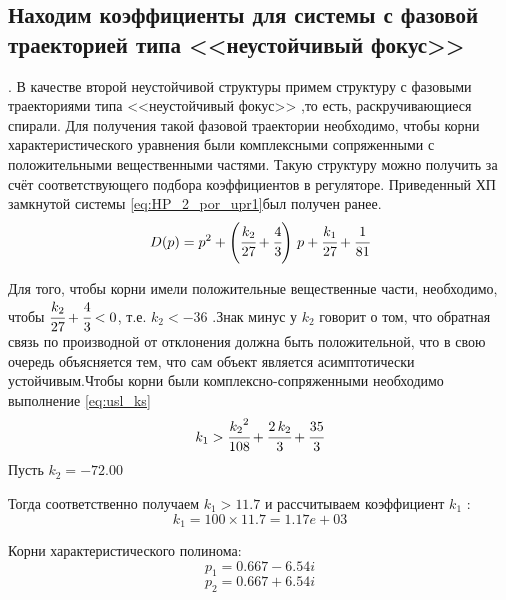 \clearpage
\subsection{Находим коэффициенты для системы с фазовой траекторией типа <<неустойчивый фокус>>}
. В качестве второй неустойчивой структуры примем структуру с фазовыми траекториями типа <<неустойчивый фокус>> ,то есть, раскручивающиеся спирали. Для получения такой фазовой траектории необходимо, чтобы корни характеристического  уравнения были комплексными сопряженными с положительными вещественными частями. Такую структуру можно получить за счёт соответствующего подбора коэффициентов в регуляторе. Приведенный ХП замкнутой системы  \eqref{eq:HP_2_por_upr1}был получен ранее. 
\begin{equation} \label{eq:HP_2_por_upr1}
D(p)=p^2+\left(\cfrac{k_{2}}{27}+\cfrac{4}{3}\right)\,p+\cfrac{k_{1}}{27}+\cfrac{1}{81}
\end{equation}

Для того, чтобы корни имели положительные вещественные части, необходимо, чтобы $\cfrac{k_{2}}{27}+\cfrac{4}{3}<0$, т.е. $k_2<-36$ .Знак минус у $k_2$  говорит о том, что обратная связь по производной от отклонения должна быть положительной, что в свою очередь объясняется тем, что сам объект является асимптотически устойчивым.Чтобы корни были комплексно-сопряженными необходимо выполнение  \eqref{eq:usl_ks}
\begin{equation} \label{eq:usl_ks}
k_1>\cfrac{{k_{2}}^2}{108}+\cfrac{2\,k_{2}}{3}+\cfrac{35}{3}
\end{equation}
Пусть $k_2=-72.00$

Тогда соответственно получаем $k_1>
11.7
$ и рассчитываем коэффициент $k_1$ : \begin{equation} \label{eq:}
k_1=100\times11.7=1.17e+03
\end{equation}

Корни характеристического полинома:
\begin{equation}p_1=
0.667-6.54i
\end{equation}
\begin{equation}p_2=
0.667+6.54i
\end{equation}

